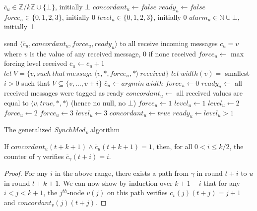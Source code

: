 \documentclass[11pt,letterpaper]{article}
\renewcommand{\leq}{\leqslant}
\newcommand{\cent}{\gamma}
\newcommand{\SM}{{\em SynchMod}$_{\,k}\ $}
\begin{document}
\begin{algorithm}[htb]\label{algo:code}
\begin{distribalgo}[1]
\BLANK {}
	\STATE $\overline{c}_u \in \mathds{Z}/k\mathds{Z} \cup \{\bot\}$, initially $\bot$
	\STATE $concordant_u \leftarrow false$
	\STATE $ready_u \leftarrow false$
	\STATE $force_u \in \{0, 1, 2, 3\}$, initially 0
	\STATE $level_u \in \{0, 1, 2, 3\}$, initially 0
	\STATE $alarm_u \in \mathds{N} \cup \bot$, initially $\bot$

\ENDINDENT \BLANK

	\STATE send $\langle \overline{c}_u, concordant_u, force_u, ready_u \rangle$ to all 
	\STATE receive incoming messages
		\STATE $c_u = v$ where $v$ is the value of any received message, 0 if none received
	\ENDIF
	\STATE $force_u \leftarrow$ max forcing level received
		\STATE $\overline{c}_u \leftarrow \overline{c}_u+1$
	\ELSE
		\STATE $let~V = \{v, such~that~message~\langle v, *, force_u, * \rangle~received\}$
		\STATE $let~width(v) =$ smallest $i > 0$ such that $V \subseteq \{v, \dots, v+i\}$
		\STATE $\overline{c}_u \leftarrow argmin~width$
	\ENDIF
		\STATE $force_u \leftarrow 0$
	\ENDIF
	\STATE $ready_u \leftarrow$ all received messages were tagged as ready
	\STATE $concordant_u \leftarrow$ all received values are equal to $\langle v, true, *, * \rangle$ (hence no null, no $\bot$) \label{line:conc_gossip}
			\STATE $force_u \leftarrow 1$
			\STATE $level_u \leftarrow 1$
		\ENDIF
			\STATE $level_u \leftarrow 2$
			\STATE $force_u \leftarrow 2$
		\ENDIF
			\STATE $force_u \leftarrow 3$
			\STATE $level_u \leftarrow 3$
		\ENDIF
		\STATE $concordant_u \leftarrow true$
		\STATE $ready_u \leftarrow level_u > 1$
	\ENDIF
\ENDINDENT 

\caption{The generalized \SM algorithm} \label{algo:R}
\end{distribalgo}

\end{algorithm}

\begin{lemma}
	If $concordant_u(t+k+1) \wedge \overline{c}_u(t+k+1) = 1$, then, for all $0 < i \leq k/2$, the counter of $\cent$ verifies $\overline{c}_\cent(t+i) = i$.
\end{lemma}
\begin{proof}
	For any $i$ in the above range, there exists a path from $\cent$ in round $t+i$ to $u$ in round $t+k+1$. 
	We can now show by induction over $k+1-i$ that for any $i < j < k+1$, the $j^{th}$-node $v(j)$ on this path verifies $c_v(j)(t+j) = j+1$ and $concordant_v(j)(t+j)$.
\end{proof}
\end{document}
